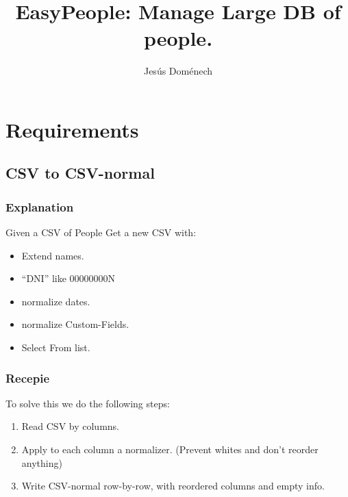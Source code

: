 \documentclass{article}
\begin{document}
\title{EasyPeople: Manage Large DB of people.}


\author{Jes\'us Dom\'enech}

\maketitle 

\section{Requirements}

\subsection{CSV to CSV-normal}

\subsubsection{Explanation}
Given a CSV of People Get a new CSV with:
\begin{itemize}
\item Extend names.
\item ``DNI'' like 00000000N
\item normalize dates.
\item normalize Custom-Fields.
\item Select From list.
\end{itemize}

\subsubsection{Recepie}
To solve this we do the following steps:
\begin{enumerate}
\item Read CSV by columns.
\item Apply to each column a normalizer. (Prevent whites and don't
  reorder anything)
\item Write CSV-normal row-by-row, with reordered columns and empty info.
\end{enumerate}
\end{document}
